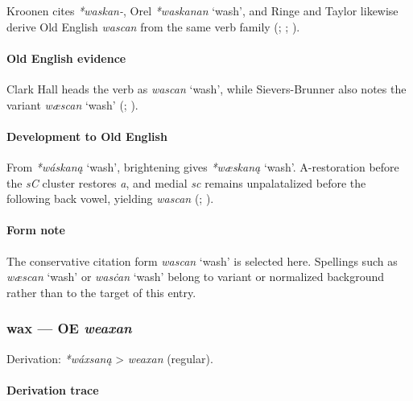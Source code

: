 \documentclass[
  british,
  a4paper,
]{article}
\providecommand{\Recon}[1]{\emph{*#1}}
\begin{document}
Kroonen cites \emph{*waskan-}, Orel \Recon{waskanan} `wash', and Ringe
and Taylor likewise derive Old English \emph{wascan} from the same verb
family (;
;
).

\paragraph{Old English evidence}\label{old-english-evidence-74}

Clark Hall heads the verb as \emph{wascan} `wash', while Sievers-Brunner
also notes the variant \emph{wæscan} `wash'
(;
).

\paragraph{Development to Old
English}\label{development-to-old-english-73}

From \Recon{wáskaną} `wash', brightening gives \Recon{wæskaną} `wash'.
A-restoration before the \emph{sC} cluster restores \emph{a}, and medial
\emph{sc} remains unpalatalized before the following back vowel,
yielding \emph{wascan} (;
).

\paragraph{Form note}\label{form-note-23}

The conservative citation form \emph{wascan} `wash' is selected here.
Spellings such as \emph{wæscan} `wash' or \emph{wasċan} `wash' belong to
variant or normalized background rather than to the target of this
entry.

\subsubsection{\texorpdfstring{wax --- OE
\emph{weaxan}}{wax --- OE weaxan}}\label{wax-oe-weaxan}

Derivation: \emph{*wáxsaną} \textgreater{} \emph{weaxan} (regular).

\paragraph{Derivation trace}\label{derivation-trace-92}
\end{document}
